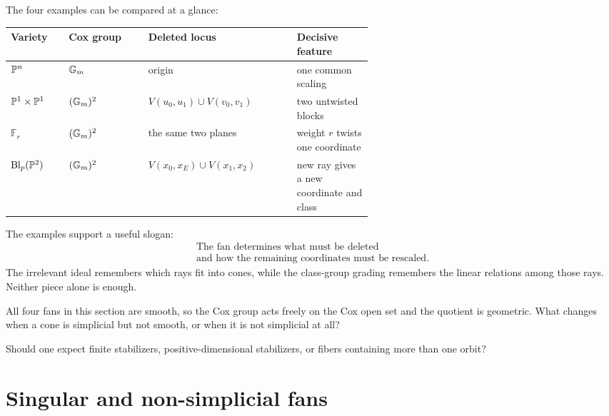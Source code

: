 \begin{surfacelaboratory}
The four examples can be compared at a glance:

\medskip

\begin{center}
\small
\begin{tabularx}{\linewidth}{@{}
  >{\raggedright\arraybackslash}p{0.16\linewidth}
  >{\raggedright\arraybackslash}p{0.22\linewidth}
  >{\raggedright\arraybackslash}X
  >{\raggedright\arraybackslash}p{0.21\linewidth}@{}}
\toprule
\textbf{Variety}
&
\textbf{Cox group}
&
\textbf{Deleted locus}
&
\textbf{Decisive feature}
\\
\midrule
\(\PP^n\)
&
\(\Gm\)
&
origin
&
one common scaling
\\
\(\PP^1\times\PP^1\)
&
\((\Gm)^2\)
&
\(V(u_0,u_1)\cup V(v_0,v_1)\)
&
two untwisted blocks
\\
\(\mathbb F_r\)
&
\((\Gm)^2\)
&
the same two planes
&
weight \(r\) twists one coordinate
\\
\(\Blp{\PP^2}{p}\)
&
\((\Gm)^2\)
&
\(V(x_0,x_E)\cup V(x_1,x_2)\)
&
new ray gives a new coordinate and class
\\
\bottomrule
\end{tabularx}
\end{center}
\end{surfacelaboratory}

The examples support a useful slogan:
\[
\boxed{
\begin{gathered}
\text{The fan determines what must be deleted}\\
\text{and how the remaining coordinates must be rescaled.}
\end{gathered}
}
\]
The irrelevant ideal remembers which rays fit into cones, while the
class-group grading remembers the linear relations among those rays.
Neither piece alone is enough.

\begin{guidingquestion}
All four fans in this section are smooth, so the Cox group acts freely
on the Cox open set and the quotient is geometric. What changes when a
cone is simplicial but not smooth, or when it is not simplicial at all?

Should one expect finite stabilizers, positive-dimensional
stabilizers, or fibers containing more than one orbit?
\end{guidingquestion}
\section{Singular and non-simplicial fans}
\label{sec:singular-nonsimplicial-cox-quotients}


